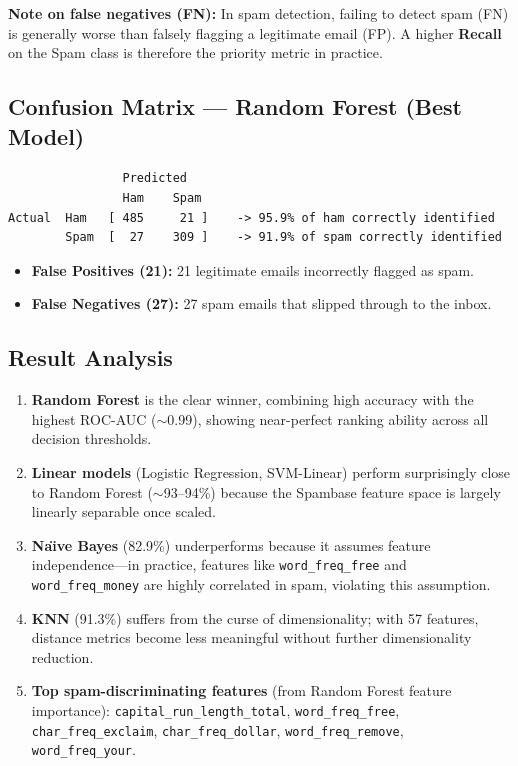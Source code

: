 \documentclass[12pt, a4paper]{article}
\begin{document}
\noindent\textbf{Note on false negatives (FN):} In spam detection, failing to detect spam (FN) is generally worse than falsely flagging a legitimate email (FP). A higher \textbf{Recall} on the Spam class is therefore the priority metric in practice.

\subsection{Confusion Matrix --- Random Forest (Best Model)}

\begin{verbatim}
                Predicted
                Ham    Spam
Actual  Ham   [ 485     21 ]    -> 95.9% of ham correctly identified
        Spam  [  27    309 ]    -> 91.9% of spam correctly identified
\end{verbatim}

\begin{itemize}
    \item \textbf{False Positives (21):} 21 legitimate emails incorrectly flagged as spam.
    \item \textbf{False Negatives (27):} 27 spam emails that slipped through to the inbox.
\end{itemize}

\subsection{Result Analysis}
\begin{enumerate}
    \item \textbf{Random Forest} is the clear winner, combining high accuracy with the highest ROC-AUC ($\sim$0.99), showing near-perfect ranking ability across all decision thresholds.
    \item \textbf{Linear models} (Logistic Regression, SVM-Linear) perform surprisingly close to Random Forest ($\sim$93--94\%) because the Spambase feature space is largely linearly separable once scaled.
    \item \textbf{Na\"{\i}ve Bayes} (82.9\%) underperforms because it assumes feature independence---in practice, features like \texttt{word\_freq\_free} and \texttt{word\_freq\_money} are highly correlated in spam, violating this assumption.
    \item \textbf{KNN} (91.3\%) suffers from the curse of dimensionality; with 57 features, distance metrics become less meaningful without further dimensionality reduction.
    \item \textbf{Top spam-discriminating features} (from Random Forest feature importance): \texttt{capital\_run\_length\_total}, \texttt{word\_freq\_free}, \texttt{char\_freq\_exclaim}, \texttt{char\_freq\_dollar}, \texttt{word\_freq\_remove}, \texttt{word\_freq\_your}.
\end{enumerate}
\end{document}
